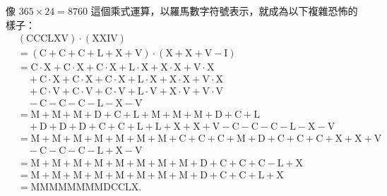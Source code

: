 像 $365 \times 24 = 8760$ 這個乘式運算，以羅馬數字符號表示，就成為以下複雜恐怖的樣子：
\begin{align*}
  & (\mathrm{CCCLXV}) \cdot (\mathrm{XXIV}) \\
  &= (\mathrm{C}+\mathrm{C}+\mathrm{C}+\mathrm{L}+\mathrm{X}+\mathrm{V}) \cdot (\mathrm{X}+\mathrm{X}+\mathrm{V}-\mathrm{I}) \\
  &= \mathrm{C}\cdot\mathrm{X} + \mathrm{C}\cdot\mathrm{X} + \mathrm{C}\cdot\mathrm{X} + \mathrm{L}\cdot\mathrm{X} + \mathrm{X}\cdot\mathrm{X} + \mathrm{V}\cdot\mathrm{X} \\
  &\quad + \mathrm{C}\cdot\mathrm{X} + \mathrm{C}\cdot\mathrm{X} + \mathrm{C}\cdot\mathrm{X} + \mathrm{L}\cdot\mathrm{X} + \mathrm{X}\cdot\mathrm{X} + \mathrm{V}\cdot\mathrm{X} \\
  &\quad + \mathrm{C}\cdot\mathrm{V} + \mathrm{C}\cdot\mathrm{V} + \mathrm{C}\cdot\mathrm{V} + \mathrm{L}\cdot\mathrm{V} + \mathrm{X}\cdot\mathrm{V} + \mathrm{V}\cdot\mathrm{V} \\
  &\quad - \mathrm{C} - \mathrm{C} - \mathrm{C} - \mathrm{L} - \mathrm{X} - \mathrm{V} \\
  &= \mathrm{M}+\mathrm{M}+\mathrm{M}+\mathrm{D}+\mathrm{C}+\mathrm{L} + \mathrm{M}+\mathrm{M}+\mathrm{M}+\mathrm{D}+\mathrm{C}+\mathrm{L} \\
  &\quad + \mathrm{D}+\mathrm{D}+\mathrm{D}+\mathrm{C}+\mathrm{C}+\mathrm{L}+\mathrm{L}+\mathrm{X}+\mathrm{X}+\mathrm{V} - \mathrm{C} - \mathrm{C} - \mathrm{C} - \mathrm{L} - \mathrm{X} - \mathrm{V} \\
  &= \mathrm{M}+\mathrm{M}+\mathrm{M}+\mathrm{M}+\mathrm{M}+\mathrm{M}+\mathrm{M}+\mathrm{C}+\mathrm{C}+\mathrm{C}+\mathrm{M}+\mathrm{D}+\mathrm{C}+\mathrm{C}+\mathrm{C}+\mathrm{X}+\mathrm{X}+\mathrm{V} \\
  &\quad - \mathrm{C} - \mathrm{C} - \mathrm{C} - \mathrm{L} + \mathrm{X} - \mathrm{V} \\
  &= \mathrm{M}+\mathrm{M}+\mathrm{M}+\mathrm{M}+\mathrm{M}+\mathrm{M}+\mathrm{M}+\mathrm{M}+\mathrm{D}+\mathrm{C}+\mathrm{C}+\mathrm{C} - \mathrm{L} + \mathrm{X} \\
  &= \mathrm{M}+\mathrm{M}+\mathrm{M}+\mathrm{M}+\mathrm{M}+\mathrm{M}+\mathrm{M}+\mathrm{M}+\mathrm{D}+\mathrm{C}+\mathrm{C}+\mathrm{L}+\mathrm{X} \\
  &= \mathrm{MMMMMMMMDCCLX}.
\end{align*}
